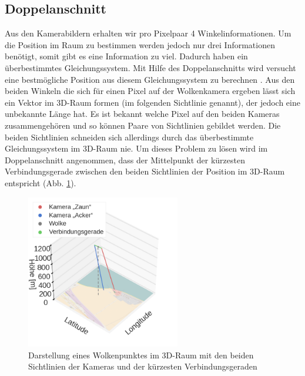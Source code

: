 \documentclass[a4paper,11pt,twoside,german]{article}
\begin{document}
\subsection{Doppelanschnitt}
\label{SECDoppel}
Aus den Kamerabildern erhalten wir pro Pixelpaar 4 Winkelinformationen. Um die Position im Raum zu bestimmen werden jedoch nur drei Informationen benötigt, somit gibt es eine Information zu viel. Dadurch haben ein überbestimmtes Gleichungssystem. Mit Hilfe des Doppelanschnitts wird versucht eine bestmögliche Position aus diesem Gleichungssystem zu berechnen \citep{lange_16_praktikum}.
\clearpage
Aus den beiden Winkeln die sich für einen Pixel auf der Wolkenkamera ergeben lässt sich ein Vektor im 3D-Raum formen (im folgenden Sichtlinie genannt), der jedoch eine unbekannte Länge hat. Es ist bekannt welche Pixel auf den beiden Kameras zusammengehören und so können Paare von Sichtlinien gebildet werden. Die beiden Sichtlinien schneiden sich allerdings durch das überbestimmte Gleichungssystem im 3D-Raum nie. Um dieses Problem zu lösen wird im Doppelanschnitt angenommen, dass der Mittelpunkt der kürzesten Verbindungsgerade zwischen den beiden Sichtlinien der Position im 3D-Raum entspricht (Abb. \ref{FIGDoppel3d}).\\
\begin{figure}[h]
	\begin{center}
		\includegraphics[width=0.6\textwidth]{media/3d.png}
		\caption[Darstellung des Doppelanschnitts]{Darstellung eines Wolkenpunktes im 3D-Raum mit den beiden Sichtlinien der Kameras und der kürzesten Verbindungsgeraden}
		\label{FIGDoppel3d}
	\end{center}
\end{figure}
\end{document}
